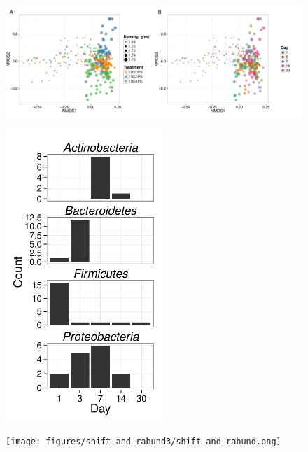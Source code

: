 \thispagestyle{empty}


\begin{figure}[H] \begin{center}
\centerline{\includegraphics[width=11.4cm]{figures/ordination_all1/ordination_all.pdf}}
\caption{\protect}\label{fig:ord}
\end{center} \end{figure}

\begin{figure}[H]
	\begin{center}
	\centerline{\includegraphics[width=6.0cm]{figures/xylose_rspndr_bar/xylose_rspndr_bar.pdf}}
	\caption{\protect}\label{fig:xyl_count}
        \end{center}
\end{figure}

\begin{figure}[H]
	\begin{center}
	\centerline{\texttt{[image: figures/shift\_and\_rabund3/shift\_and\_rabund.png]}}
	\caption{\protect}\label{fig:shift}
    \end{center}
\end{figure}

